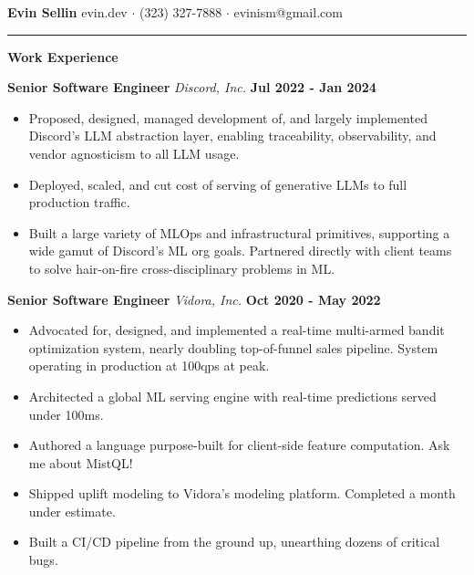 \documentclass[10pt]{letter}
\begin{document}
\textbf{Evin Sellin}
\hfill
evin.dev $\cdot$ (323) 327-7888 $\cdot$ evinism@gmail.com
\vspace{4px}
\hrule
\textbf{Work Experience}

\hspace*{2px}
\textbf{Senior Software Engineer}
\textit{Discord, Inc.}
\hfill 
\textbf{Jul 2022 - Jan 2024}
\begin{itemize}
  \item Proposed, designed, managed development of, and largely implemented Discord's LLM abstraction layer, enabling traceability, observability, and vendor agnosticism to all LLM usage.
  \item Deployed, scaled, and cut cost of serving of generative LLMs to full production traffic.
  \item Built a large variety of MLOps and infrastructural primitives, supporting a wide gamut of Discord's ML org goals. Partnered directly with client teams to solve hair-on-fire cross-disciplinary problems in ML.
\end{itemize}

\hspace*{2px}
\textbf{Senior Software Engineer} 
\textit{Vidora, Inc.}
\hfill 
\textbf{Oct 2020 - May 2022}
\begin{itemize}
  \item Advocated for, designed, and implemented a real-time multi-armed bandit optimization system, nearly doubling top-of-funnel sales pipeline. System operating in production at 100qps at peak.
  \item Architected a global ML serving engine with real-time predictions served under 100ms.
  \item Authored a language purpose-built for client-side feature computation. Ask me about MistQL!
  \item Shipped uplift modeling to Vidora's modeling platform. Completed a month under estimate.
  \item Built a CI/CD pipeline from the ground up, unearthing dozens of critical bugs.
\end{itemize}
\end{document}

